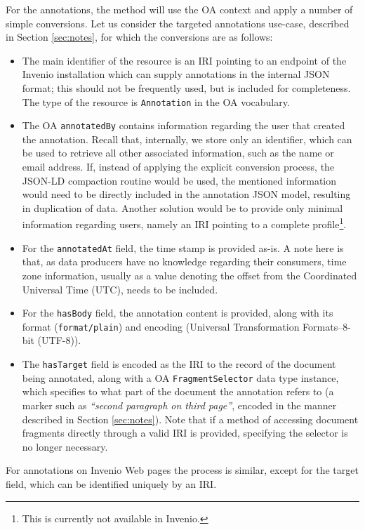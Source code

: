 For the annotations, the method will use the OA context and apply a number of
simple conversions. Let us consider the targeted annotations use-case,
described in Section \ref{sec:notes}, for which the conversions are as follows:
\begin{itemize}
  \item The main identifier of the resource is an IRI pointing to an endpoint of
        the Invenio installation which can supply annotations in the internal
        JSON format; this should not be frequently used, but is included for
        completeness. The type of the resource is \texttt{Annotation} in the
        OA vocabulary.
  \item The OA \texttt{annotatedBy} contains information regarding
        the user that created the annotation. Recall that, internally, we store
        only an identifier, which can be used to retrieve all other associated
        information, such as the name or email address. If, instead of applying
        the explicit conversion process, the JSON-LD compaction routine would be
        used, the mentioned information would need to be directly included in
        the annotation JSON model, resulting in duplication of data. Another
        solution would be to provide only minimal information regarding users,
        namely an IRI pointing to a complete profile\footnote{This is currently
        not available in Invenio.}.
  \item For the \texttt{annotatedAt} field, the time stamp is provided as-is. A
        note here is that, as data producers have no knowledge regarding their
        consumers, time zone information, usually as a value denoting the offset
        from the Coordinated Universal Time (UTC), needs to be included.
  \item For the \texttt{hasBody} field, the annotation content is provided, along
        with its format (\texttt{format/plain}) and encoding (Universal
        Transformation Formats--8-bit (UTF-8)).
  \item The \texttt{hasTarget} field is encoded as the IRI to the record of the
        document being annotated, along with a OA \texttt{FragmentSelector}
        data type instance, which specifies to what part of the document the
        annotation refers to (a marker such as \textit{``second paragraph on
        third page''}, encoded in the manner described in
        Section \ref{sec:notes}). Note that if a method of accessing document
        fragments directly through a valid IRI is provided, specifying the
        selector is no longer necessary.
\end{itemize}
For annotations on Invenio Web pages the process is similar, except for the
target field, which can be identified uniquely by an IRI.


